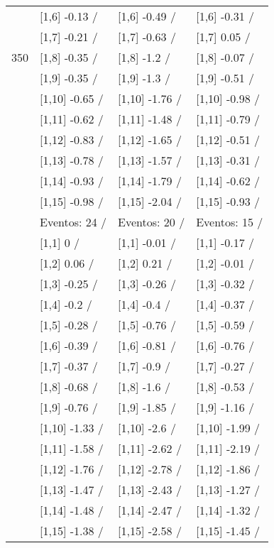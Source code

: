 \begin{table}
\begin{tabular}[t]{llll}
 & {}[1,6] -0.13  / & {}[1,6] -0.49  / & {}[1,6] -0.31  /\\
 & {}[1,7] -0.21  / & {}[1,7] -0.63  / & {}[1,7] 0.05  /\\
350 & {}[1,8] -0.35  / & {}[1,8] -1.2  / & {}[1,8] -0.07  /\\
\addlinespace
 & {}[1,9] -0.35  / & {}[1,9] -1.3  / & {}[1,9] -0.51  /\\
 & {}[1,10] -0.65  / & {}[1,10] -1.76  / & {}[1,10] -0.98  /\\
 & {}[1,11] -0.62  / & {}[1,11] -1.48  / & {}[1,11] -0.79  /\\
 & {}[1,12] -0.83  / & {}[1,12] -1.65  / & {}[1,12] -0.51  /\\
 & {}[1,13] -0.78  / & {}[1,13] -1.57  / & {}[1,13] -0.31  /\\
\addlinespace
 & {}[1,14] -0.93  / & {}[1,14] -1.79  / & {}[1,14] -0.62  /\\
 & {}[1,15] -0.98  / & {}[1,15] -2.04  / & {}[1,15] -0.93  /\\
 & Eventos:  24 / & Eventos:  20 / & Eventos:  15 /\\
 & {}[1,1] 0  / & {}[1,1] -0.01  / & {}[1,1] -0.17  /\\
 & {}[1,2] 0.06  / & {}[1,2] 0.21  / & {}[1,2] -0.01  /\\
\addlinespace
 & {}[1,3] -0.25  / & {}[1,3] -0.26  / & {}[1,3] -0.32  /\\
 & {}[1,4] -0.2  / & {}[1,4] -0.4  / & {}[1,4] -0.37  /\\
 & {}[1,5] -0.28  / & {}[1,5] -0.76  / & {}[1,5] -0.59  /\\
 & {}[1,6] -0.39  / & {}[1,6] -0.81  / & {}[1,6] -0.76  /\\
 & {}[1,7] -0.37  / & {}[1,7] -0.9  / & {}[1,7] -0.27  /\\
\addlinespace
500 & {}[1,8] -0.68  / & {}[1,8] -1.6  / & {}[1,8] -0.53  /\\
 & {}[1,9] -0.76  / & {}[1,9] -1.85  / & {}[1,9] -1.16  /\\
 & {}[1,10] -1.33  / & {}[1,10] -2.6  / & {}[1,10] -1.99  /\\
 & {}[1,11] -1.58  / & {}[1,11] -2.62  / & {}[1,11] -2.19  /\\
 & {}[1,12] -1.76  / & {}[1,12] -2.78  / & {}[1,12] -1.86  /\\
\addlinespace
 & {}[1,13] -1.47  / & {}[1,13] -2.43  / & {}[1,13] -1.27  /\\
 & {}[1,14] -1.48  / & {}[1,14] -2.47  / & {}[1,14] -1.32  /\\
 & {}[1,15] -1.38  / & {}[1,15] -2.58  / & {}[1,15] -1.45  /\\
\bottomrule
\end{tabular}
\end{table}
